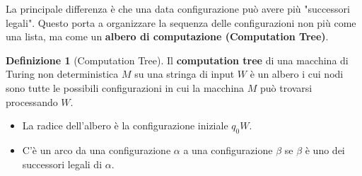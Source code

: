 \documentclass[a4paper]{article}
\theoremstyle{definition} %
\newtheorem{definition}{Definizione}
\begin{document}
La principale differenza è che una data configurazione può avere più "successori legali". Questo porta a organizzare la sequenza delle configurazioni non più come una lista, ma come un \textbf{albero di computazione (Computation Tree)}.

\begin{definition}[Computation Tree]
Il \textbf{computation tree} di una macchina di Turing non deterministica $M$ su una stringa di input $W$ è un albero i cui nodi sono tutte le possibili configurazioni in cui la macchina $M$ può trovarsi processando $W$.
\begin{itemize}
    \item La radice dell'albero è la configurazione iniziale $q_0W$.
    \item C'è un arco da una configurazione $\alpha$ a una configurazione $\beta$ se $\beta$ è uno dei successori legali di $\alpha$.
\end{itemize}
\end{definition}
\end{document}
